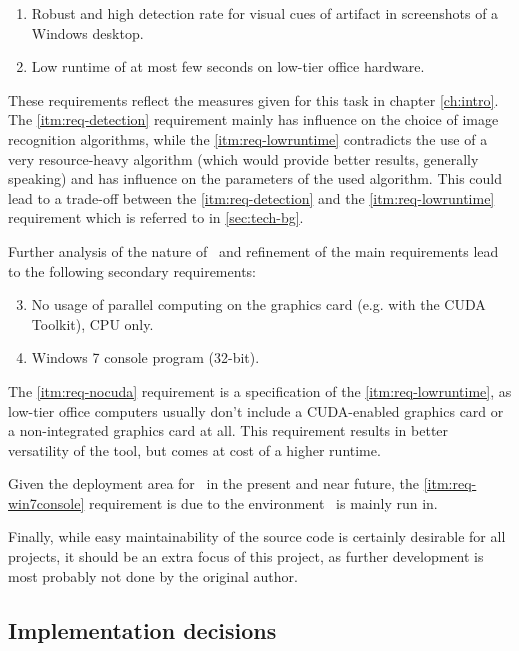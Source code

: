 \begin{enumerate}
	\item \label{itm:req-detection} Robust and high detection rate for visual cues of artifact in screenshots of a Windows desktop.
	\item \label{itm:req-lowruntime} Low runtime of at most few seconds on low-tier office hardware.
\end{enumerate}

These requirements reflect the measures given for this task in chapter \ref{ch:intro}. The \ref{itm:req-detection} requirement mainly has influence on the choice of image recognition algorithms, while the \ref{itm:req-lowruntime} contradicts the use of a very resource-heavy algorithm (which would provide better results, generally speaking) and has influence on the parameters of the used algorithm. This could lead to a trade-off between the \ref{itm:req-detection} and the \ref{itm:req-lowruntime} requirement which is referred to in \ref{sec:tech-bg}.

Further analysis of the nature of \ape~and refinement of the main requirements lead to the following secondary requirements:

\begin{enumerate}\setcounter{enumi}{2}
	\item \label{itm:req-nocuda} No usage of parallel computing on the graphics card (e.g. with the CUDA Toolkit\cite{cuda}), CPU only.
	\item \label{itm:req-win7console} Windows 7 console program (32-bit).
\end{enumerate}

The \ref{itm:req-nocuda} requirement is a specification of the \ref{itm:req-lowruntime}, as low-tier office computers usually don't include a CUDA-enabled graphics card or a non-integrated graphics card at all. This requirement results in better versatility of the tool, but comes at cost of a higher runtime.

Given the deployment area for \ape~in the present and near future, the \ref{itm:req-win7console} requirement is due to the environment \ape~is mainly run in.

Finally, while easy maintainability of the source code is certainly desirable for all projects, it should be an extra focus of this project, as further development is most probably not done by the original author.

\subsection{Implementation decisions}

